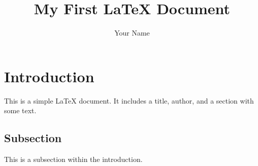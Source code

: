 \documentclass{article}
\title{My First LaTeX Document}
\author{Your Name}
\begin{document}
\maketitle

\section{Introduction}
This is a simple LaTeX document. It includes a title, author, and a section with some text.

\subsection{Subsection}
This is a subsection within the introduction.
\end{document}
